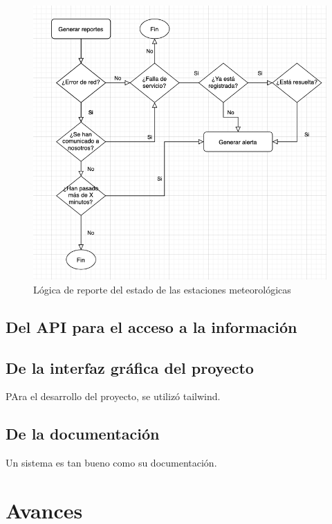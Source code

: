 
\begin{figure}[!ht]
	\centering
	\includegraphics[width=1\linewidth]{images/diagrams/report_logic.png}
	\caption{Lógica de reporte del estado de las estaciones meteorológicas}
	\label{fig:logica_de_reporte}
\end{figure}


\subsection{Del API para el acceso a la información}

\subsection{De la interfaz gráfica del proyecto}

PAra el desarrollo del proyecto, se utilizó tailwind.

\subsection{De la documentación}

Un sistema es tan bueno como su documentación.

\section{Avances}


